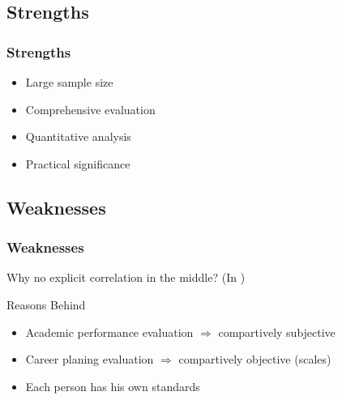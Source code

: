 \subsection{Strengths}
\begin{frame}
    \frametitle{Strengths}
    \Large
    \begin{itemize}[<+->]
        \item Large sample size
        \item Comprehensive evaluation
        \item Quantitative analysis
        \item Practical significance
    \end{itemize}
\end{frame}

\subsection{Weaknesses}
\begin{frame}
    \frametitle{Weaknesses}
    \Large
    Why no explicit correlation in the middle? (In )
    \begin{block}{Reasons Behind}
        \begin{itemize}[<+->]
            \item Academic performance evaluation $\Rightarrow$ compartively subjective
            \item Career planing evaluation $\Rightarrow$ compartively objective (scales)
            \item Each person has his own standards
        \end{itemize}
    \end{block}
\end{frame}
